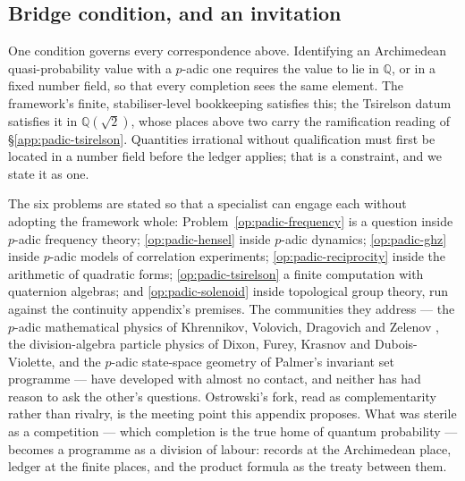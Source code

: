 \subsection{Bridge condition, and an invitation}
\label{app:padic-bridge}

One condition governs every correspondence above. Identifying an Archimedean
quasi-probability value with a $p$-adic one requires the value to lie in $\mathbb{Q}$,
or in a fixed number field, so that every completion sees the same element. The
framework's finite, stabiliser-level bookkeeping satisfies this; the Tsirelson datum
satisfies it in $\mathbb{Q}(\sqrt{2})$, whose places above two carry the ramification
reading of \S\ref{app:padic-tsirelson}. Quantities irrational without qualification
must first be located in a number field before the ledger applies; that is a
constraint, and we state it as one.

The six problems are stated so that a specialist can engage each without adopting the
framework whole: Problem~\ref{op:padic-frequency} is a question inside $p$-adic
frequency theory; \ref{op:padic-hensel} inside $p$-adic dynamics;
\ref{op:padic-ghz} inside $p$-adic models of correlation experiments;
\ref{op:padic-reciprocity} inside the arithmetic of quadratic forms;
\ref{op:padic-tsirelson} a finite computation with quaternion algebras; and
\ref{op:padic-solenoid} inside topological group theory, run against the continuity
appendix's premises. The communities they address --- the $p$-adic mathematical
physics of Khrennikov, Volovich, Dragovich and Zelenov
\autocite{khrennikov1995, vladimirovvolovich1989, dragovich1995}, the division-algebra
particle physics of Dixon, Furey, Krasnov and Dubois-Violette, and the $p$-adic
state-space geometry of Palmer's invariant set programme \autocite{palmer2009} ---
have developed with almost no contact, and neither has had reason to ask the other's
questions. Ostrowski's fork, read as complementarity rather than rivalry, is the
meeting point this appendix proposes. What was sterile as a competition --- which
completion is the true home of quantum probability --- becomes a programme as a
division of labour: records at the Archimedean place, ledger at the finite places, and
the product formula as the treaty between them.

